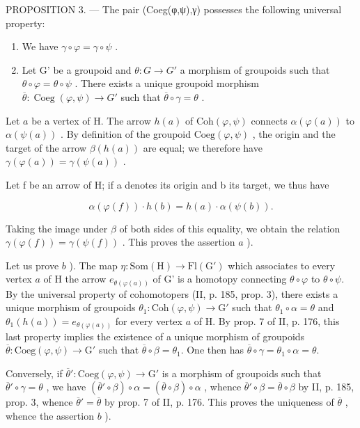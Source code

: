 PROPOSITION 3. --- The pair (Coeg(φ,ψ),γ) possesses the following universal property:

\begin{enumerate}
\def\labelenumi{\alph{enumi})}
\item
  We have \(\gamma \circ \varphi = \gamma \circ \psi\) .
\item
  Let G' be a groupoid and \(\theta\colon G\to G'\) a morphism of groupoids such that \(\theta\circ\varphi=\theta\circ\psi\) . There exists a unique groupoid morphism \(\overline{\theta}\colon\operatorname{Coeg}(\varphi,\psi)\to G'\) such that \(\overline{\theta}\circ\gamma=\theta\) .
\end{enumerate}

Let \(a\) be a vertex of H. The arrow \(h(a)\) of \(\mathrm{Coh}(\varphi, \psi)\) connects \(\alpha(\varphi(a))\) to \(\alpha(\psi(a))\) . By definition of the groupoid \(\mathrm{Coeg}(\varphi, \psi)\) , the origin and the target of the arrow \(\beta(h(a))\) are equal; we therefore have \(\gamma(\varphi(a)) = \gamma(\psi(a))\) .

Let f be an arrow of H; if a denotes its origin and b its target, we thus have

\[
\alpha (\varphi (f)) \cdot h (b) = h (a) \cdot \alpha (\psi (b)).
\]

Taking the image under \(\beta\) of both sides of this equality, we obtain the relation \(\gamma(\varphi(f)) = \gamma(\psi(f))\) . This proves the assertion \(a\) ).

Let us prove \(b\) ). The map \(\eta\colon\mathrm{Som}(\mathrm{H})\to\mathrm{Fl}(\mathrm{G}')\) which associates to every vertex \(a\) of H the arrow \(e_{\theta(\varphi(a))}\) of G' is a homotopy connecting \(\theta\circ\varphi\) to \(\theta\circ\psi\). By the universal property of cohomotopers (II, p. 185, prop. 3), there exists a unique morphism of groupoids \(\theta_1\colon\mathrm{Coh}(\varphi,\psi)\to\mathrm{G}'\) such that \(\theta_1\circ\alpha=\theta\) and \(\theta_1(h(a))=e_{\theta(\varphi(a))}\) for every vertex \(a\) of H. By prop. 7 of II, p. 176, this last property implies the existence of a unique morphism of groupoids \(\overline{\theta}\colon\mathrm{Coeg}(\varphi,\psi)\to\mathrm{G}'\) such that \(\overline{\theta}\circ\beta=\theta_1\). One then has \(\overline{\theta}\circ\gamma=\theta_1\circ\alpha=\theta\).

Conversely, if \(\overline{\theta}'\colon \mathrm{Coeg}(\varphi,\psi)\to \mathrm{G}'\) is a morphism of groupoids such that \(\overline{\theta}'\circ\gamma=\theta\) , we have \((\overline{\theta}'\circ\beta)\circ\alpha=(\overline{\theta}\circ\beta)\circ\alpha\) , whence \(\overline{\theta}'\circ\beta=\overline{\theta}\circ\beta\) by II, p. 185, prop. 3, whence \(\overline{\theta}'=\overline{\theta}\) by prop. 7 of II, p. 176. This proves the uniqueness of \(\overline{\theta}\) , whence the assertion \(b\) ).

